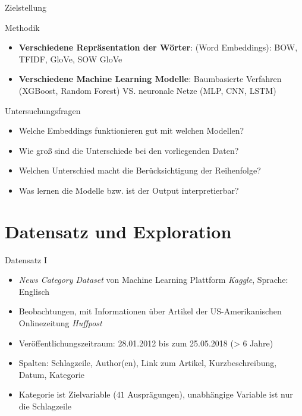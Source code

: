 \documentclass[8pt, xcolor = dvipsnames]{beamer}
\begin{document}
\begin{frame}{Zielstellung}

\begin{block}{Methodik}
\begin{itemize}
    \item \textbf{Verschiedene Repräsentation der Wörter}: (Word Embeddings): BOW, TFIDF, GloVe, SOW GloVe 
    \item \textbf{Verschiedene Machine Learning Modelle}: Baumbasierte Verfahren (XGBoost, Random Forest) VS. neuronale Netze (MLP, CNN, LSTM)
\end{itemize}{}
\end{block}{}

\begin{block}{Untersuchungsfragen}
\begin{itemize}
    \item Welche Embeddings funktionieren gut mit welchen Modellen?
    \item Wie groß sind die Unterschiede bei den vorliegenden Daten?
    \item Welchen Unterschied macht die Berücksichtigung der Reihenfolge?
    \item Was lernen die Modelle bzw. ist der Output interpretierbar?
\end{itemize}{}
\end{block}{}


\end{frame}



\section{Datensatz und Exploration}


\begin{frame}{Datensatz I}

   \begin{itemize}
   \item \textit{News Category Dataset} von Machine Learning Plattform \textit{Kaggle}, Sprache: Englisch
   \item {} Beobachtungen, mit Informationen  über Artikel der US-Amerikanischen Onlinezeitung \textit{Huffpost}
   \item  Veröffentlichungszeitraum: 28.01.2012 bis zum 25.05.2018 (> $6$ Jahre)
   \item Spalten: Schlagzeile, Author(en), Link zum Artikel, Kurzbeschreibung, Datum, Kategorie
   \item Kategorie ist Zielvariable ($41$ Ausprägungen), unabhängige Variable ist nur die Schlagzeile
   \end{itemize}

\end{frame}
\end{document}
